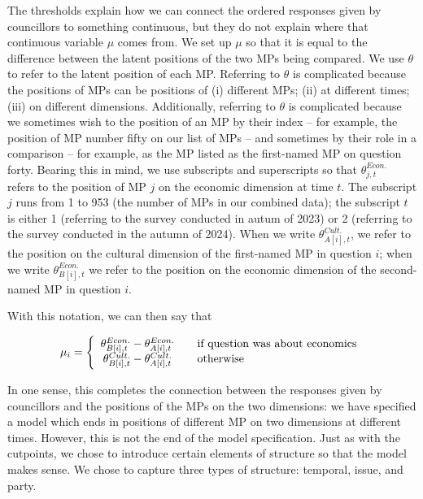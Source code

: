 \documentclass[
]{article}
\begin{document}
The thresholds explain how we can connect the ordered responses given by
councillors to something continuous, but they do not explain where that
continuous variable \(\mu\) comes from. We set up \(\mu\) so that it is
equal to the difference between the latent positions of the two MPs
being compared. We use \(\theta\) to refer to the latent position of
each MP. Referring to \(\theta\) is complicated because the positions of
MPs can be positions of (i) different MPs; (ii) at different times;
(iii) on different dimensions. Additionally, referring to \(\theta\) is
complicated because we sometimes wish to the position of an MP by their
index -- for example, the position of MP number fifty on our list of MPs
-- and sometimes by their role in a comparison -- for example, as the MP
listed as the first-named MP on question forty. Bearing this in mind, we
use subscripts and superscripts so that \(\theta^{Econ.}_{j, t}\) refers
to the position of MP \(j\) on the economic dimension at time \(t\). The
subscript \(j\) runs from 1 to 953 (the number of MPs in our combined
data); the subscript \(t\) is either 1 (referring to the survey
conducted in autum of 2023) or 2 (referring to the survey conducted in
the autumn of 2024). When we write \(\theta^{Cult.}_{A[i], t}\), we
refer to the position on the cultural dimension of the first-named MP in
question \(i\); when we write \(\theta^{Econ.}_{B[i], t}\) we refer to
the position on the economic dimension of the second-named MP in
question \(i\).

With this notation, we can then say that

\doublespacing

\[
\mu_i = \left\{ 
  \begin{array}{ c l }
    \theta^{Econ.}_{B[i], t} - \theta^{Econ.}_{A[i], t} & \quad \textrm{if question was about economics} \\
    \theta^{Cult.}_{B[i], t} - \theta^{Cult.}_{A[i], t} & \quad \textrm{otherwise}
  \end{array}
\right.
\]

\singlespacing

In one sense, this completes the connection between the responses given
by councillors and the positions of the MPs on the two dimensions: we
have specified a model which ends in positions of different MP on two
dimensions at different times. However, this is not the end of the model
specification. Just as with the cutpoints, we chose to introduce certain
elements of structure so that the model makes sense. We chose to capture
three types of structure: temporal, issue, and party.
\end{document}

